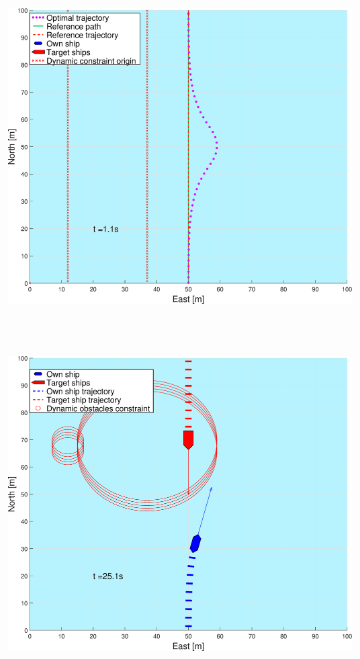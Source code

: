 \begin{figure}[ht!]
\begin{subfigure}[b]{0.49\textwidth}
    \end{subfigure}
    \hfill
    \begin{subfigure}[b]{0.499\textwidth}
        \centering
        \includegraphics[width=\textwidth]{Images/Figures/enkel_HO/_Simple_0fig999_time=1}
        \subcaption{}
    \end{subfigure}
    \hfill
    \\
    \begin{subfigure}[b]{0.49\textwidth}
        \centering
        \includegraphics[width=\textwidth]{Images/Figures/enkel_HO/_Simple_0fig1_time=25}

\end{subfigure}
\end{figure}

